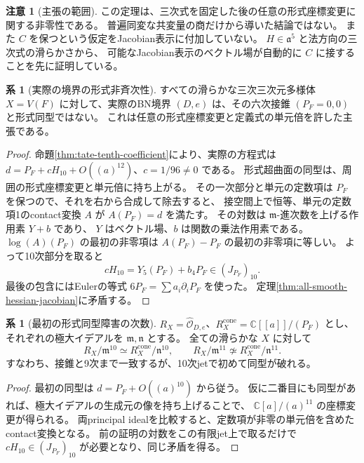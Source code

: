 \documentclass[a4paper,11pt]{ltjsarticle}
\theoremstyle{definition}
\newtheorem{remark}[theorem]{注意}
\newtheorem{corollary}[theorem]{系}
\newcommand{\CC}{\mathbb C}
\newcommand{\OO}{\mathcal O}
\begin{document}
\begin{remark}[主張の範囲]
この定理は、三次式を固定した後の任意の形式座標変更に関する非零性である。
普遍同変な共変量の商だけから導いた結論ではない。
また $C$ を保つという仮定をJacobian表示に付加していない。
$H\in\mathfrak a^5$ と法方向の三次式の滑らかさから、
可能なJacobian表示のベクトル場が自動的に $C$ に接することを先に証明している。
\end{remark}

\begin{corollary}[実際の境界の形式非斉次性]
\label{cor:all-smooth-nonhomogeneity}
すべての滑らかな三次三次元多様体 $X=V(F)$ に対して、実際のBN境界
$(D,e)$ は、その六次接錐 $(P_F=0,0)$ と形式同型ではない。
これは任意の形式座標変更と定義式の単元倍を許した主張である。
\end{corollary}
\begin{proof}
命題\ref{thm:tate-tenth-coefficient}により、実際の方程式は
$d=P_F+cH_{10}+O((a)^{12})$、$c=1/96\ne0$ である。
形式超曲面の同型は、周囲の形式座標変更と単元倍に持ち上がる。
その一次部分と単元の定数項は $P_F$ を保つので、それを右から合成して除去すると、
接空間上で恒等、単元の定数項1のcontact変換 $A$ が $A(P_F)=d$ を満たす。
その対数は $\mathfrak m$-進次数を上げる作用素 $Y+b$ であり、
$Y$ はベクトル場、$b$ は関数の乗法作用素である。
$\log(A)(P_F)$ の最初の非零項は $A(P_F)-P_F$ の最初の非零項に等しい。
よって10次部分を取ると
\[
 cH_{10}=Y_5(P_F)+b_4P_F\in(J_{P_F})_{10}.
\]
最後の包含にはEulerの等式 $6P_F=\sum a_i\partial_iP_F$ を使った。
定理\ref{thm:all-smooth-hessian-jacobian}に矛盾する。
\end{proof}


\begin{corollary}[最初の形式同型障害の次数]\label{cor:boundary-tenth-jet-obstruction}
$R_X=\widehat{\OO}_{D,e}$、$R_X^{\mathrm{cone}}=\CC[[a]]/(P_F)$ とし、
それぞれの極大イデアルを $\mathfrak m,\mathfrak n$ とする。
全ての滑らかな $X$ に対して
\[
 R_X/\mathfrak m^{10}\simeq R_X^{\mathrm{cone}}/\mathfrak n^{10},
 \qquad
 R_X/\mathfrak m^{11}\not\simeq R_X^{\mathrm{cone}}/\mathfrak n^{11}.
\]
すなわち、接錐と9次まで一致するが、10次jetで初めて同型が破れる。
\end{corollary}
\begin{proof}
最初の同型は $d=P_F+O((a)^{10})$ から従う。
仮に二番目にも同型があれば、極大イデアルの生成元の像を持ち上げることで、
$\CC[a]/(a)^{11}$ の座標変更が得られる。
両principal idealを比較すると、定数項が非零の単元倍を含めたcontact変換となる。
前の証明の対数をこの有限jet上で取るだけで
$cH_{10}\in(J_{P_F})_{10}$ が必要となり、同じ矛盾を得る。
\end{proof}
\end{document}
